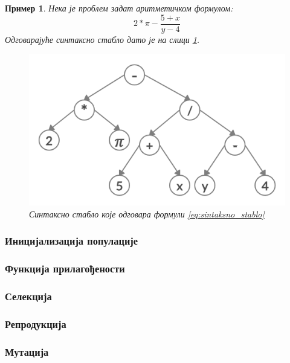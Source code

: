 \documentclass[a4paper]{article}
\newtheorem{primer}{Пример}[section] %
\begin{document}
\begin{primer}
Нека је проблем задат аритметичком формулом: 
\begin{equation} 
    \label{eq:sintaksno_stablo}
    2*\pi-\frac{5+x}{y-4}
\end{equation}
Одговарајуће синтаксно стабло дато је на слици \ref{fig:sintaksno_stablo}.

\begin{figure}[h!]
\begin{center}
\includegraphics[scale=0.25]{sintaksnoStablo.png}
\end{center}
\caption{Синтаксно стабло које одговара формули \ref{eq:sintaksno_stablo}}
\label{fig:sintaksno_stablo}
\end{figure}
\end{primer}

\subsubsection{Иницијализација популације}
\subsubsection{Функција прилагођености}
\subsubsection{Селекција}
\subsubsection{Репродукција}
\label{sec:reprodukcija}
\subsubsection{Мутација}
\label{sec:mutacija}
\end{document}
